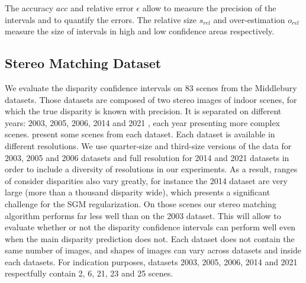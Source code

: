 The accuracy $acc$ and relative error $\epsilon$ allow to measure the precision of the intervals and to quantify the errors. The relative size $s_{rel}$ and over-estimation $o_{rel}$ measure the size of intervals in high and low confidence areas respectively. 

\subsection{Stereo Matching Dataset}\label{sec:dataset}
We evaluate the disparity confidence intervals on $83$ scenes from the Middlebury datasets. Those datasets are composed of two stereo images of indoor scenes, for which the true disparity is known with precision. It is separated on different years: 2003, 2005, 2006, 2014 and 2021 \cite{scharstein_high-accuracy_2003, scharstein_learning_2007, hirschmuller_evaluation_2007, scharstein_high-resolution_2014}, each year presenting more complex scenes.  present some scenes from each dataset.  Each dataset is available in different resolutions. We use quarter-size and third-size versions of the data for 2003, 2005 and 2006 datasets and full resolution for 2014 and 2021 datasets in order to include a diversity of resolutions in our experiments. As a result, ranges of consider disparities also vary greatly, for instance the 2014 dataset are very large (more than a thousand disparity wide), which presents a significant challenge for the SGM regularization. On those scenes our stereo matching algorithm performs far less well than on the 2003 dataset. This will allow to evaluate whether or not the disparity confidence intervals can perform well even when the main disparity prediction does not. Each dataset does not contain the same number of images, and shapes of images can vary across datasets and inside each datasets. For indication purposes, datasets 2003, 2005, 2006, 2014 and 2021 respectfully contain 2, 6, 21, 23 and 25 scenes.

